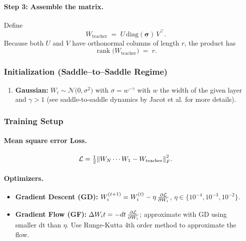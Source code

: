 \documentclass[11pt]{article}
\newcommand{\Wteacher}{\ensuremath{W_{\mathrm{teacher}}}}
\newcommand{\Wi}{\ensuremath{W_i}}
\newcommand{\Wprod}{\ensuremath{W_N\cdots W_1}}
\begin{document}
\paragraph{Step 3: Assemble the matrix.}
Define
\[
  W_{\text{teacher}}
  \;=\;
  U \,\mathrm{diag}(\boldsymbol{\sigma})\, V^{\top}.
\]
Because both \(U\) and \(V\) have orthonormal columns of length \(r\),
the product has
\[
  \operatorname{rank}\bigl(W_{\text{teacher}}\bigr) \;=\; r.
\]

\subsubsection*{Initialization (Saddle–to–Saddle Regime)}
\label{sec:init}
\begin{enumerate}
  \item \textbf{Gaussian:} \(\Wi \sim \mathcal{N}\!\bigl(0,\sigma^2\bigr)\) with $\sigma=w^{-\gamma}$ with $w$ the width of the given layer and $\gamma>1$ (see saddle-to-saddle dynamics by Jacot et al. for more details).
\end{enumerate}

\subsubsection*{Training Setup}

\paragraph*{Mean square error Loss.}
\[
  \mathcal{L} = \tfrac12 \norm{\Wprod - \Wteacher}_F^{2}.
\]

\paragraph*{Optimizers.}
\begin{itemize}[nosep]
  \item \textbf{Gradient Descent (GD):}\quad
        \(\Wi^{(t+1)} = \Wi^{(t)} - \eta\,\pdv{\mathcal{L}}{\Wi}\),
        \(\eta \in \{10^{-4}, 10^{-3}, 10^{-2}\}\).
  \item \textbf{Gradient Flow (GF):}\quad
        \(\Delta{\Wi}{t} = -dt\,\pdv{\mathcal{L}}{\Wi}\);
        approximate with GD using smaller dt than \(\eta\). Use Runge-Kutta 4th order method to approximate the flow.
\end{itemize}

\end{document}
